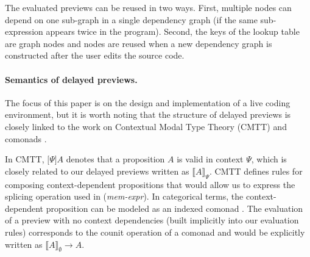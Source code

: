 \documentclass[acmsmall,anonymous,fleqn]{acmart}\settopmatter{printfolios=false,printccs=false,printacmref=false}
\theoremstyle{plain}
\theoremstyle{definition}
\begin{document}
The evaluated previews can be reused in two ways. First, multiple nodes can
depend on one sub-graph in a single dependency graph (if the same sub-expression appears
twice in the program). Second, the keys of the lookup table are graph nodes and nodes are
reused when a new dependency graph is constructed after the user edits the source code.

\paragraph{Semantics of delayed previews.}
The focus of this paper is on the design and implementation of a live coding environment,
but it is worth noting that the structure of delayed previews is closely linked to the work
on Contextual Modal Type Theory (CMTT) \cite{cmtt} and comonads \cite{cmtt-denotation}.

In CMTT, $\lbrack \Psi \rbrack A$ denotes that a proposition $A$ is valid in context $\Psi$,
which is closely related to our delayed previews written as $\llbracket A \rrbracket_\Psi$.
CMTT defines rules for composing context-dependent propositions that would allow us to express
the splicing operation used in (\emph{mem-expr}). In categorical terms, the context-dependent
proposition can be modeled as an indexed comonad \cite{effectrev,graded}. The evaluation of a preview with no
context dependencies (built implicitly into our evaluation rules) corresponds to the counit
operation of a comonad and would be explicitly written as $\llbracket A \rrbracket_\emptyset \rightarrow A$.

\end{document}
